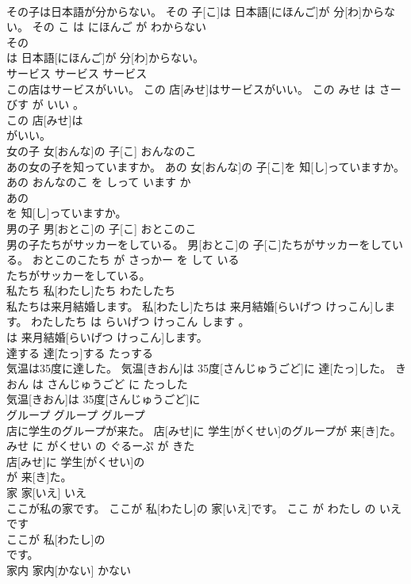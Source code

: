 \documentclass[8pt]{extreport}
\begin{document}
\begin{CJK}{UTF8}{min}
\\	その子は日本語が分からない。	その 子[こ]は 日本語[にほんご]が 分[わ]からない。	その こ は にほんご が わからない	
\\	その
\\	は 日本語[にほんご]が 分[わ]からない。		
\\	サービス	サービス	サービス	
\\	この店はサービスがいい。	この 店[みせ]はサービスがいい。	この みせ は さーびす が いい 。	
\\	この 店[みせ]は
\\	がいい。		
\\	女の子	女[おんな]の 子[こ]	おんなのこ	
\\	あの女の子を知っていますか。	あの 女[おんな]の 子[こ]を 知[し]っていますか。	あの おんなのこ を しって います か	
\\	あの
\\	を 知[し]っていますか。		
\\	男の子	男[おとこ]の 子[こ]	おとこのこ	
\\	男の子たちがサッカーをしている。	男[おとこ]の 子[こ]たちがサッカーをしている。	おとこのこたち が さっかー を して いる	
\\	たちがサッカーをしている。		
\\	私たち	私[わたし]たち	わたしたち	
\\	私たちは来月結婚します。	私[わたし]たちは 来月結婚[らいげつ けっこん]します。	わたしたち は らいげつ けっこん します 。	
\\	は 来月結婚[らいげつ けっこん]します。		
\\	達する	達[たっ]する	たっする	
\\	気温は35度に達した。	気温[きおん]は 35度[さんじゅうごど]に 達[たっ]した。	きおん は さんじゅうごど に たっした	
\\	気温[きおん]は 35度[さんじゅうごど]に
\\	グループ	グループ	グループ	
\\	店に学生のグループが来た。	店[みせ]に 学生[がくせい]のグループが 来[き]た。	みせ に がくせい の ぐるーぷ が きた	
\\	店[みせ]に 学生[がくせい]の
\\	が 来[き]た。		
\\	家	家[いえ]	いえ	
\\	ここが私の家です。	ここが 私[わたし]の 家[いえ]です。	ここ が わたし の いえ です	
\\	ここが 私[わたし]の
\\	です。		
\\	家内	家内[かない]	かない	

\end{CJK}
\end{document}
